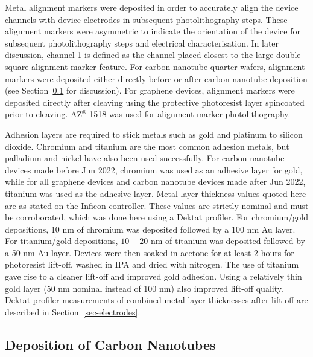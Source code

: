 \documentclass[
  a4paper,
]{scrbook}
\begin{document}
Metal alignment markers were deposited in order to accurately align the
device channels with device electrodes in subsequent photolithography
steps. These alignment markers were asymmetric to indicate the
orientation of the device for subsequent photolithography steps and
electrical characterisation. In later discussion, channel 1 is defined
as the channel placed closest to the large double square alignment
marker feature. For carbon nanotube quarter wafers, alignment markers
were deposited either directly before or after carbon nanotube
deposition (see Section~\ref{sec-dep-carbon-nanotubes} for discussion).
For graphene devices, alignment markers were deposited directly after
cleaving using the protective photoresist layer spincoated prior to
cleaving. AZ\(^\circledR\) 1518 was used for alignment marker
photolithography.

Adhesion layers are required to stick metals such as gold and platinum
to silicon dioxide. Chromium and titanium are the most common adhesion
metals, but palladium and nickel have also been used
successfully\autocite{Guarnieri2014,Shkodra2021}. For carbon nanotube
devices made before Jun 2022, chromium was used as an adhesive layer for
gold, while for all graphene devices and carbon nanotube devices made
after Jun 2022, titanium was used as the adhesive layer. Metal layer
thickness values quoted here are as stated on the Inficon controller.
These values are strictly nominal and must be corroborated, which was
done here using a Dektat profiler. For chromium/gold depositions, 10 nm
of chromium was deposited followed by a 100 nm Au layer. For
titanium/gold depositions, \(10-20\) nm of titanium was deposited
followed by a 50 nm Au layer. Devices were then soaked in acetone for at
least 2 hours for photoresist lift-off, washed in IPA and dried with
nitrogen. The use of titanium gave rise to a cleaner lift-off and
improved gold adhesion. Using a relatively thin gold layer (50 nm
nominal instead of 100 nm) also improved lift-off quality. Dektat
profiler measurements of combined metal layer thicknesses after lift-off
are described in Section~\ref{sec-electrodes}.

\hypertarget{sec-dep-carbon-nanotubes}{%
\subsection{Deposition of Carbon
Nanotubes}\label{sec-dep-carbon-nanotubes}}
\end{document}
